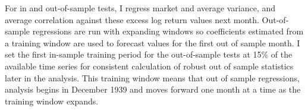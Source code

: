For in and out-of-sample tests, I regress market and average variance, and average correlation against these excess log return values next month. Out-of-sample regressions are run with expanding windows so coefficients estimated from a training window are used to forecast values for the first out of sample month. I set the first in-sample training period for the out-of-sample tests at 15\% of the available time series for consistent calculation of robust out of sample statistics later in the analysis. This training window means that out of sample regressions, analysis begins in December 1939 and moves forward one month at a time as the training window expands.



